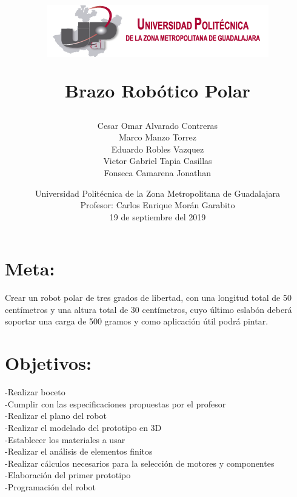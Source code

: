 \documentclass[12pt,a4paper]{report}
\begin{document}
\author{Cesar Omar Alvarado Contreras\\
Marco Manzo Torrez\\
Eduardo Robles Vazquez\\
Victor Gabriel Tapia Casillas\\
Fonseca Camarena Jonathan}

\title{\begin{center}
\includegraphics[scale=1.5]{Escudo.png} 
\end{center}Brazo Robótico Polar}

\date{
Universidad Politécnica de la Zona Metropolitana de Guadalajara\\
Profesor: Carlos Enrique Morán Garabito\\
19 de septiembre del 2019}

\maketitle
\tableofcontents
\section{Meta:}
Crear un robot polar de tres grados de libertad, con una longitud total de 50 centímetros y una altura total de 30 centímetros, cuyo último eslabón deberá soportar una carga de 500 gramos y como aplicación útil podrá pintar.
\section{Objetivos:}
\noindent
-Realizar boceto\\
-Cumplir con las especificaciones propuestas por el profesor\\
-Realizar el plano del robot\\
-Realizar el modelado del prototipo en 3D\\
-Establecer los materiales a usar\\ 
-Realizar el análisis de elementos finitos\\
-Realizar cálculos necesarios para la selección de motores y componentes\\
-Elaboración del primer prototipo\\
-Programación del robot\\
\end{document}
